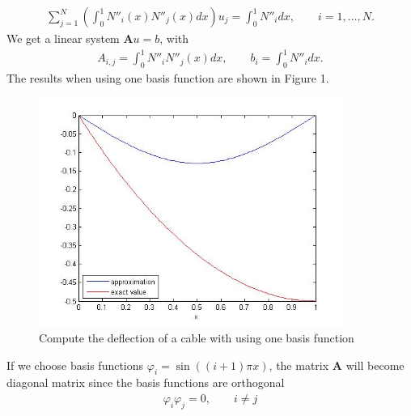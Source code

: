 \documentclass{article}
\begin{document}
\begin{gather}
\displaystyle  \sum^{N}_{j=1} \left(\int^{1}_{0}N''_{i}(x)N''_{j}(x)dx\right)u_{j}=\int^{1}_{0}N''_{i}dx, \qquad i=1, \ldots, N.
\end{gather}
We get a linear system $\textbf{A}u=b$, with
\begin{gather}
A_{i,j}=\displaystyle\int^{1}_{0}N''_{i}N''_{j}(x)dx, \qquad
\displaystyle b_{i}=\int^{1}_{0}N''_{i}dx.
\end{gather}
The results when using one basis function are shown in Figure 1.
\begin{figure}[H]
\begin{center}
\includegraphics[width=10cm]{ex17.jpg}    %
\caption{Compute the deflection of a cable with using one basis function}
\end{center}
\end{figure}
\par
If we choose basis functions $\varphi_{i}=\sin((i+1)\pi x)$, the matrix \textbf{A} will become diagonal matrix since the basis functions are orthogonal
\begin{gather}
\varphi_{i}\varphi_{j}=0,  \qquad i\neq j
\end{gather}
\end{document}
